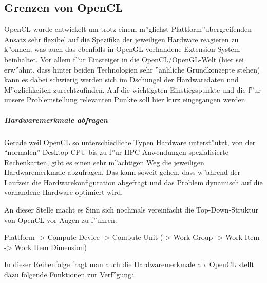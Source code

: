\begin{refsection}
\subsection{Grenzen von OpenCL}

OpenCL wurde entwickelt um trotz einem m''glichst Plattform''ubergreifenden Ansatz 
sehr flexibel auf die Spezifika der jeweiligen Hardware reagieren zu k''onnen, was
auch das ebenfalls in OpenGL vorhandene Extension-System beinhaltet. Vor allem f''ur
Einsteiger in die OpenCL/OpenGL-Welt (hier sei erw''ahnt, dass hinter beiden 
Technologien sehr ''anhliche Grundkonzepte stehen) kann es dabei schwierig werden
sich im Dschungel der Hardwaredaten und M''oglichkeiten zurechtzufinden. Auf die 
wichtigsten Einstiegspunkte und die f''ur unsere Problemstellung relevanten Punkte
soll hier kurz eingegangen werden.


\subparagraph{Hardwaremerkmale abfragen}

Gerade weil OpenCL so unterschiedliche Typen Hardware unterst''utzt, von der ``normalen''
Desktop-CPU bis zu f''ur HPC Anwendungen spezialisierte Rechenkarten, gibt es einen
sehr m''achtigen Weg die jeweiligen Hardwaremerkmale abzufragen. Das kann soweit 
gehen, dass w''ahrend der Laufzeit die Hardwarekonfiguration abgefragt und das 
Problem dynamisch auf die vorhandene Hardware optimiert wird.

An dieser Stelle macht es Sinn sich nochmals vereinfacht die Top-Down-Struktur von 
OpenCL vor Augen zu f''uhren: 

   Plattform -> Compute Device -> Compute Unit (-> Work Group -> Work Item -> Work Item Dimension)
   
In dieser Reihenfolge fragt man auch die Hardwaremerkmale ab. OpenCL stellt dazu 
folgende Funktionen zur Verf''gung:


\end{refsection}
